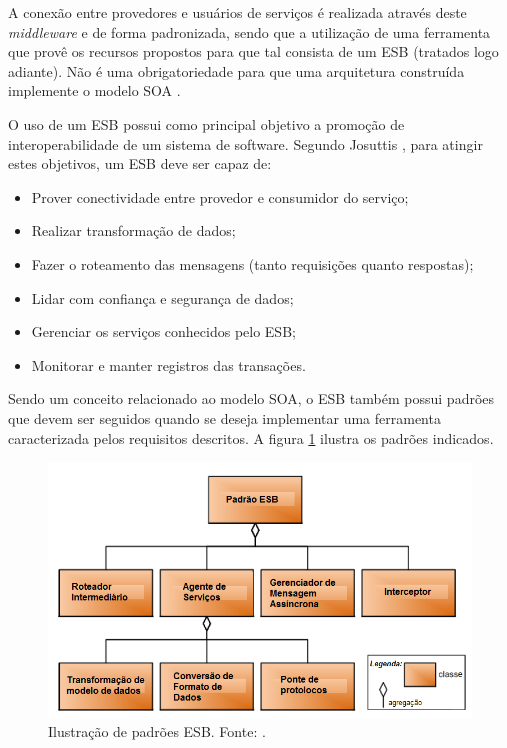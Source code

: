 A conexão entre provedores e usuários de serviços é realizada através deste \textit{middleware} e de forma padronizada, sendo que a utilização de uma ferramenta que provê os recursos propostos para que tal consista de um ESB (tratados logo adiante). Não é uma obrigatoriedade para que uma arquitetura construída implemente o modelo SOA \cite{lewis_getting_2010}.

O uso de um ESB possui como principal objetivo a promoção de interoperabilidade de um sistema de software. Segundo Josuttis \cite{josuttis_soa_2007}, para atingir estes objetivos, um ESB deve ser capaz de:

\begin{itemize}
\item Prover conectividade entre provedor e consumidor do serviço;
\item Realizar transformação de dados;
\item Fazer o roteamento das mensagens (tanto requisições quanto respostas);
\item Lidar com confiança e segurança de dados;
\item Gerenciar os serviços conhecidos pelo ESB;
\item Monitorar e manter registros das transações.
\end{itemize}

Sendo um conceito relacionado ao modelo SOA, o ESB também possui padrões que devem ser seguidos quando se deseja implementar uma ferramenta caracterizada pelos requisitos descritos. A figura \ref{padrao_ESB} ilustra os padrões indicados.

\begin{figure}[htb]
\centering
\includegraphics[scale=0.5]{figuras/padrao_ESB.png}
\caption{Ilustração de padrões ESB. Fonte: \cite{bianco_architecting_2011}.}
\label{padrao_ESB}
\end{figure}

